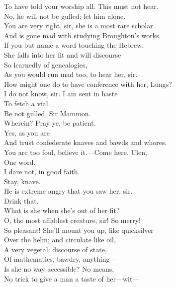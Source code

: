 \documentclass[a4paper,oneside,12pt]{memoir}
\begin{document}
\begin{drama*}
To have told your worship all. This must not hear.\\
\mammonspeaks No, he will not be gulled; let him alone.\\
\facespeaks You are very right, sir, she is a most rare scholar\\
And is gone mad with studying Broughton's works.\\
If you but name a word touching the Hebrew,\\
She falls into her fit and will discourse\\
So learnedly of genealogies,\\
As you would run mad too, to hear her, sir.\\
\mammonspeaks How might one do to have conference with her, Lungs?\\
\facespeaks I do not know, sir. I am sent in haste\\
To fetch a vial.\\
\surlyspeaks {} Be not gulled, Sir Mammon.\\
\mammonspeaks Wherein? Pray ye, be patient.\\
\surlyspeaks {} Yes, as you are\\
And trust confederate knaves and bawds and whores.\\
\mammonspeaks You are too foul, believe it.---Come here, Ulen,\\
One word.\\
\facespeaks {} I dare not, in good faith.\\
\mammonspeaks {} Stay, knave.\\
\facespeaks He is extreme angry that you saw her, sir.\\
\mammonspeaks Drink that.\\
 What is she when she's out of her fit?\\
\facespeaks O, the most affablest creature, sir! So merry!\\
So pleasant! She'll mount you up, like quicksilver\\
Over the helm; and circulate like oil,\\
A very vegetal: discourse of state,\\
Of mathematics, bawdry, anything---\\
\mammonspeaks Is she no way accessible? No means,\\
No trick to give a man a taste of her---wit---\\

\end{drama*}
\end{document}
